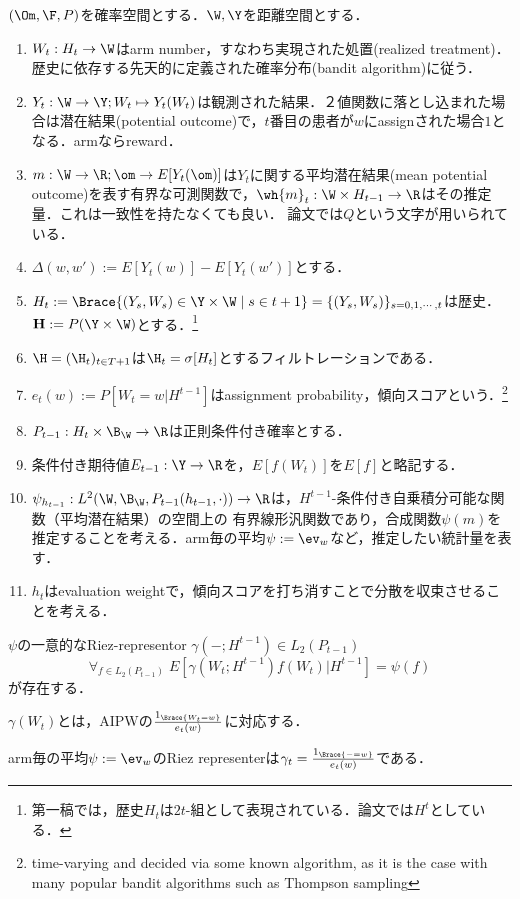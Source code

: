 \documentclass[uplatex,dvipdfmx]{jsreport}
\begin{document}
\begin{definition}
    $(\Om,\F,P)$を確率空間とする．$\W,\Y$を距離空間とする．
    \begin{enumerate}
        \item $W_t:H_t\to\W$はarm number，すなわち実現された処置(realized treatment)．歴史に依存する先天的に定義された確率分布(bandit algorithm)に従う．
        \item $Y_t:\W\to\Y;W_t\mapsto Y_t(W_t)$は観測された結果．２値関数に落とし込まれた場合は潜在結果(potential outcome)で，$t$番目の患者が$w$にassignされた場合$1$となる．armならreward．
        \item $m:\W\to\R;\om\to E[Y_t(\om)]$は$Y_t$に関する平均潜在結果(mean potential outcome)を表す有界な可測関数で，$\wh{m}_t:\W\times H_{t-1}\to\R$はその推定量．これは一致性を持たなくても良い．
        論文\cite{Policy Evaluation}では$Q$という文字が用いられている．
        \item $\Delta(w,w'):=E[Y_t(w)]-E[Y_t(w')]$とする．
        \item $H_t:=\Brace{(Y_s,W_s)\in\Y\times\W\mid s\in t+1}=\{(Y_s,W_s)\}_{s=0,1,\cdots,t}$は歴史．$\mathbf{H}:=P(\Y\times\W)$とする．\footnote{\cite{誉賛}第一稿では，歴史$H_t$は$2t$-組として表現されている．論文\cite{Policy Evaluation}では$H^{t}$としている．}
        \item $\H=(\H_t)_{t\in T+1}$は$\H_t=\sigma[H_t]$とするフィルトレーションである．
        \item $e_t(w):=P[W_t=w|H^{t-1}]$はassignment probability，傾向スコアという．\footnote{time-varying and decided via some known algorithm, as it is the case with many popular bandit algorithms such as Thompson sampling\cite{Policy Evaluation}}
        \item $P_{t-1}:H_t\times\B_\W\to\R$は正則条件付き確率とする．
        \item 条件付き期待値$E_{t-1}:\Y\to\R$を，$E[f(W_t)]$を$E[f]$と略記する．
        \item $\psi_{h_{t-1}}:L^2(\W,\B_\W,P_{t-1}(h_{t-1},\cdot))\to\R$は，$H^{t-1}$-条件付き自乗積分可能な関数（平均潜在結果）の空間上の
        有界線形汎関数であり，合成関数$\psi(m)$を推定することを考える．arm毎の平均$\psi:=\ev_w$など，推定したい統計量を表す．
        \item $h_t$はevaluation weightで，傾向スコアを打ち消すことで分散を収束させることを考える．
    \end{enumerate}
\end{definition}

\begin{theorem}
    $\psi$の一意的なRiez-representor $\gamma(-;H^{t-1})\in L_2(P_{t-1})$
    \[\forall_{f\in L_2(P_{t-1})}\;E[\gamma(W_t;H^{t-1})f(W_t)|H^{t-1}]=\psi(f)\]
    が存在する．
\end{theorem}
\begin{remarks}
    $\gamma(W_t)$とは，AIPWの$\frac{1_{\Brace{W_t=w}}}{e_t(w)}$に対応する．
\end{remarks}
\begin{example}
    arm毎の平均$\psi:=\ev_w$のRiez representerは$\gamma_t=\frac{1_{\Brace{-=w}}}{e_t(w)}$である．

\end{example}
\end{document}
